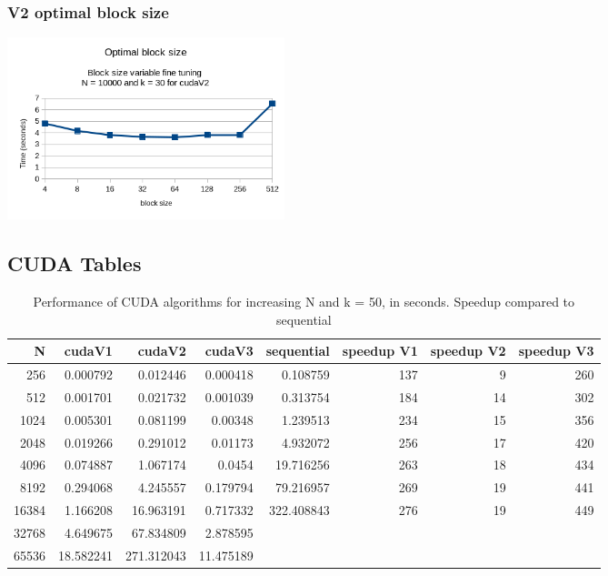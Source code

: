 \documentclass[11pt]{article}
\begin{document}
\subsubsection{V2 optimal block size}
\label{sec:org70c7b46}
\begin{center}
\includegraphics[height=200]{./images/block-size-effect.png}
\end{center}
\pagebreak
\subsection{CUDA Tables}
\label{sec:org6a7c35e}
\begin{table}[htbp]
\caption{Performance of CUDA algorithms for increasing N and k = 50, in seconds. Speedup compared to sequential}
\centering
\begin{tabular}{rrrrrrrr}
\hline
N & cudaV1 & cudaV2 & cudaV3 & sequential & speedup V1 & speedup V2 & speedup V3\\[0pt]
\hline
256 & 0.000792 & 0.012446 & 0.000418 & 0.108759 & 137 & 9 & 260\\[0pt]
512 & 0.001701 & 0.021732 & 0.001039 & 0.313754 & 184 & 14 & 302\\[0pt]
1024 & 0.005301 & 0.081199 & 0.00348 & 1.239513 & 234 & 15 & 356\\[0pt]
2048 & 0.019266 & 0.291012 & 0.01173 & 4.932072 & 256 & 17 & 420\\[0pt]
4096 & 0.074887 & 1.067174 & 0.0454 & 19.716256 & 263 & 18 & 434\\[0pt]
8192 & 0.294068 & 4.245557 & 0.179794 & 79.216957 & 269 & 19 & 441\\[0pt]
16384 & 1.166208 & 16.963191 & 0.717332 & 322.408843 & 276 & 19 & 449\\[0pt]
32768 & 4.649675 & 67.834809 & 2.878595 &  &  &  & \\[0pt]
65536 & 18.582241 & 271.312043 & 11.475189 &  &  &  & \\[0pt]
\hline
\end{tabular}
\end{table}
\end{document}
